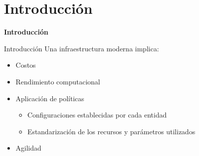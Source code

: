 \section{Introducción}

\begin{frame}
    \Huge
    \centering
    \textbf{Introducción}

\end{frame}


\begin{frame}{Introducción}
    \vspace{0cm}
    Una infraestructura moderna implica:
    \begin{itemize}
        \item Costos
        \item Rendimiento computacional
        \item Aplicación de políticas
                \begin{itemize}
                    \item Configuraciones establecidas por cada entidad
                    \item Estandarización de los recursos y parámetros utilizados
        \end{itemize}
        \item Agilidad
    \end{itemize}
\end{frame}

